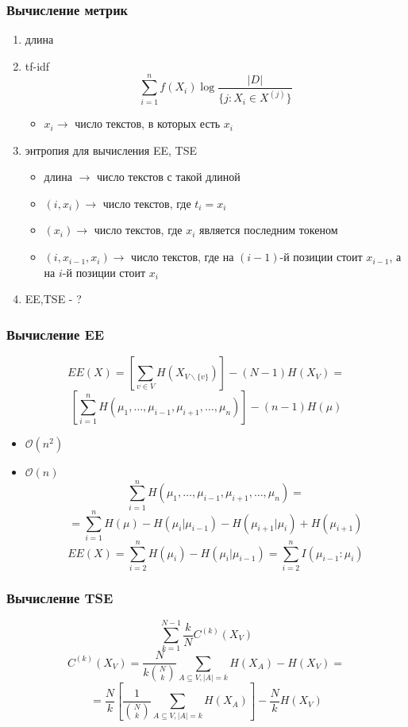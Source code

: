 \documentclass{beamer}
\begin{document}
\begin{frame}
	\frametitle{Вычисление метрик}
	\begin{enumerate}
		\item длина
		\item tf-idf
			\[\sum\limits_{i=1}^{n}f(X_i)\log\frac{|D|}{\{j:X_i\in X^{(j)}\}}\]
			\begin{itemize}
				\item $x_i \rightarrow$ число текстов, в которых есть $x_i$
			\end{itemize}
		\item энтропия для вычисления EE, TSE
			\begin{itemize}
				\item длина $\rightarrow$ число текстов с такой длиной
				\item $(i, x_i) \rightarrow$ число текстов, где $t_i = x_i$ 
				\item $(x_i)\rightarrow$ число текстов, где $x_i$ является последним токеном
				\item $(i, x_{i-1}, x_i) \rightarrow$ число текстов, где на $(i-1)$-й позиции стоит $x_{i-1}$, а на $i$-й позиции стоит $x_i$
			\end{itemize}
		\item EE,TSE - ?
	\end{enumerate}
\end{frame}

\begin{frame}
	\frametitle{Вычисление EE}
	\[
		EE(X) = \left[\sum\limits_{v\in V}H(X_{V\backslash\{v\}})\right] - (N - 1)H(X_V) = 
	\]
	\[
		\left[\sum\limits_{i=1}^{n}H(\mu_1,\ldots,\mu_{i-1},\mu_{i+1},\ldots,\mu_n)\right] - (n - 1)H(\mu)
	\]
	\begin{itemize}
		\item $\mathcal{O}(n^2)$
		\item $\mathcal{O}(n)$
			\[
				\sum\limits_{i=1}^{n}H(\mu_1,\ldots,\mu_{i-1},\mu_{i+1},\ldots,\mu_n) =\]
			\[ = \sum\limits_{i=1}^{n}H(\mu) - H(\mu_i|\mu_{i-1}) - H(\mu_{i+1}|\mu_i) + H(\mu_{i+1})\]
			\[
				EE(X) = \sum\limits_{i=2}^{n}H(\mu_i) - H(\mu_i|\mu_{i-1})= \sum\limits_{i=2}^{n}I(\mu_{i-1}\colon\mu_i)
			\]
	\end{itemize}
\end{frame}

\begin{frame}
	\frametitle{Вычисление TSE}
	\[
		\sum\limits_{k=1}^{N-1}\frac{k}{N}C^{(k)}(X_V)
	\]
	\[
	 	C^{(k)}(X_V) = \frac{N}{k\binom{N}{k}}\sum\limits_{A\subseteq V,|A|=k}H(X_A) - H(X_V) =
 	\]
 	\[
 		= \frac{N}{k}\left[\frac{1}{\binom{N}{k}}\sum\limits_{A\subseteq V,|A|=k}H(X_A)\right] - \frac{N}{k}H(X_V)
	\]
\end{frame}
\end{document}
